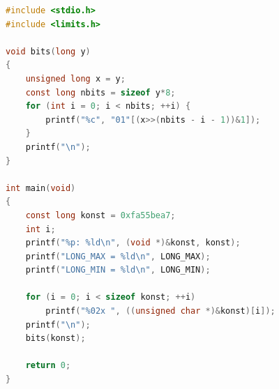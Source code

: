 \begin{lstlisting}[language=C]
#include <stdio.h>
#include <limits.h>

void bits(long y)
{
    unsigned long x = y;
    const long nbits = sizeof y*8;
    for (int i = 0; i < nbits; ++i) {
        printf("%c", "01"[(x>>(nbits - i - 1))&1]);
    }
    printf("\n");
}

int main(void)
{
    const long konst = 0xfa55bea7;
    int i;
    printf("%p: %ld\n", (void *)&konst, konst);
    printf("LONG_MAX = %ld\n", LONG_MAX);
    printf("LONG_MIN = %ld\n", LONG_MIN);
    
    for (i = 0; i < sizeof konst; ++i)
        printf("%02x ", ((unsigned char *)&konst)[i]);
    printf("\n");
    bits(konst);
    
    return 0;
}\end{lstlisting}
